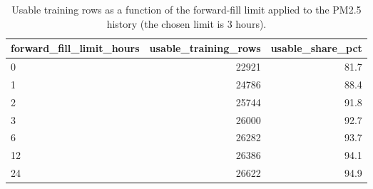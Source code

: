 \begin{table}[t]
\centering
\small
\caption{Usable training rows as a function of the forward-fill limit applied to the PM2.5 history (the chosen limit is 3 hours).}
\label{tab:table_S02_missing_value_policy}
\begin{tabular}{lrr}
\toprule
forward\_fill\_limit\_hours & usable\_training\_rows & usable\_share\_pct \\
\midrule
0 & 22921 & 81.7 \\
1 & 24786 & 88.4 \\
2 & 25744 & 91.8 \\
3 & 26000 & 92.7 \\
6 & 26282 & 93.7 \\
12 & 26386 & 94.1 \\
24 & 26622 & 94.9 \\
\bottomrule
\end{tabular}
\end{table}
